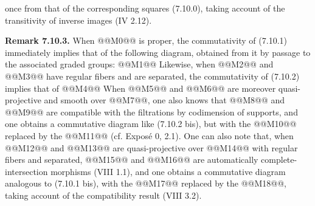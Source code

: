 once from that of the corresponding squares (7.10.0), taking account of the transitivity of inverse images (IV 2.12).

\textbf{Remark 7.10.3.} When @@M0@@ is proper, the commutativity of (7.10.1) immediately implies that of the following diagram, obtained from it by passage to the associated graded groups:
@@M1@@
Likewise, when @@M2@@ and @@M3@@ have regular fibers and are separated, the commutativity of (7.10.2) implies that of
@@M4@@
When @@M5@@ and @@M6@@ are moreover quasi-projective and smooth over @@M7@@, one also knows that @@M8@@ and @@M9@@ are compatible with the filtrations by codimension of supports, and one obtains a commutative diagram like (7.10.2 bis), but with the @@M10@@ replaced by the @@M11@@ (cf. Exposé 0, 2.1). One can also note that, when @@M12@@ and @@M13@@ are quasi-projective over @@M14@@ with regular fibers and separated, @@M15@@ and @@M16@@ are automatically complete-intersection morphisms (VIII 1.1), and one obtains a commutative diagram analogous to (7.10.1 bis), with the @@M17@@ replaced by the @@M18@@, taking account of the compatibility result (VIII 3.2).
